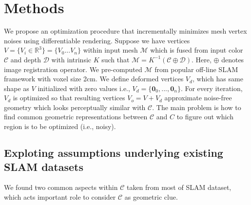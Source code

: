 \section{Methods}

We propose an optimization procedure that incrementally minimizes mesh vertex noises using differentiable rendering. 
Suppose we have vertices $V=\{V_i\in\mathbb{R}^3\}=\{V_0...V_n\}$ within input mesh $\mathcal{M}$ which is fused from input color $\mathcal{C}$ and depth $\mathcal{D}$ with intrinsic $K$ such that $\mathcal{M}=K^{-1}\left(\mathcal{C}\oplus \mathcal{D}\right)$. 
Here, $\oplus$ denotes image registration operator.
We pre-computed $\mathcal{M}$ from popular off-line SLAM framework \cite{zhou2018open3d} with voxel size 2cm.
We define deformed vertices $V_d$, which has same shape as $V$ initialized with zero values i.e., $V_d=\{\mathbf{0}_0,...,\mathbf{0}_n\}$. 
For every iteration, $V_d$ is optimized so that resulting vertices $V_o=V+V_d$ approximate noise-free geometry which looks perceptually similar with $\mathcal{C}$. 
The main problem is how to find common geometric representations between $\mathcal{C}$ and $C$ to figure out which region is to be optimized (i.e., noisy).


\subsection{Exploting assumptions underlying existing SLAM datasets}
We found two common aspects within $\mathcal{C}$ taken from most of SLAM dataset, which acts important role to consider $\mathcal{C}$ as geometric clue.

